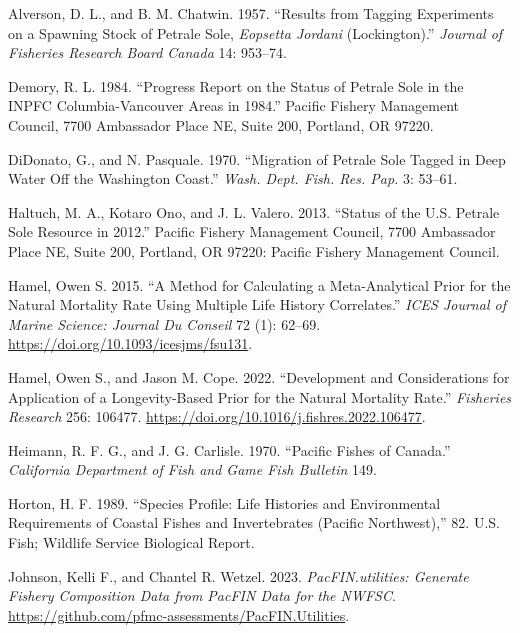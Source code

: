 \documentclass[
]{scrartcl}
\newlength{\cslhangindent}
\newenvironment{CSLReferences}[2] %
 {\begin{list}{}{%
  \setlength{\itemindent}{0pt}
  \setlength{\leftmargin}{0pt}
  \setlength{\parsep}{0pt}
  \ifodd #1
   \setlength{\leftmargin}{\cslhangindent}
   \setlength{\itemindent}{-1\cslhangindent}
  \fi
  \setlength{\itemsep}{#2\baselineskip}}}
 {\end{list}}
\begin{document}
\label{refs}
\begin{CSLReferences}{1}{0}
Alverson, D. L., and B. M. Chatwin. 1957. {``Results from Tagging
Experiments on a Spawning Stock of Petrale Sole, \emph{{Eopsetta}
Jordani} ({Lockington}).''} \emph{Journal of Fisheries Research Board
Canada} 14: 953--74.

Demory, R. L. 1984. {``Progress Report on the Status of Petrale Sole in
the {INPFC} {Columbia}-{Vancouver} Areas in 1984.''} Pacific Fishery
Management Council, 7700 Ambassador Place NE, Suite 200, Portland, OR
97220.

DiDonato, G., and N. Pasquale. 1970. {``Migration of Petrale Sole Tagged
in Deep Water Off the {Washington} Coast.''} \emph{Wash. Dept. Fish.
Res. Pap.} 3: 53--61.

Haltuch, M. A., Kotaro Ono, and J. L. Valero. 2013. {``Status of the
{U}.{S}. Petrale Sole Resource in 2012.''} Pacific Fishery Management
Council, 7700 Ambassador Place NE, Suite 200, Portland, OR 97220:
Pacific Fishery Management Council.

Hamel, Owen S. 2015. {``A Method for Calculating a Meta-Analytical Prior
for the Natural Mortality Rate Using Multiple Life History
Correlates.''} \emph{ICES Journal of Marine Science: Journal Du Conseil}
72 (1): 62--69. \url{https://doi.org/10.1093/icesjms/fsu131}.

Hamel, Owen S., and Jason M. Cope. 2022. {``Development and
Considerations for Application of a Longevity-Based Prior for the
Natural Mortality Rate.''} \emph{Fisheries Research} 256: 106477.
\url{https://doi.org/10.1016/j.fishres.2022.106477}.

Heimann, R. F. G., and J. G. Carlisle. 1970. {``Pacific {Fishes} of
{Canada}.''} \emph{California Department of Fish and Game Fish Bulletin}
149.

Horton, H. F. 1989. {``Species Profile: Life Histories and Environmental
Requirements of Coastal Fishes and Invertebrates ({Pacific}
{Northwest}),''} 82. U.S. Fish; Wildlife Service Biological Report.

Johnson, Kelli F., and Chantel R. Wetzel. 2023. \emph{PacFIN.utilities:
Generate Fishery Composition Data from PacFIN Data for the NWFSC}.
\url{https://github.com/pfmc-assessments/PacFIN.Utilities}.


\end{CSLReferences}
\end{document}
